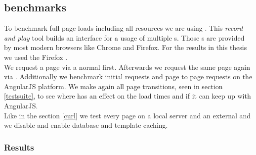 \subsection{\selenium{} benchmarks\label{selenium}}

To benchmark full page loads including all resources we are using \selenium{}.
This \emph{record and play} tool builds an interface for a usage of multiple \webdriver{}s.
Those \webdriver{}s are provided by most modern browsers like Chrome and Firefox.
For the results in this thesis we used the Firefox \webdriver{}.
\\
We request a page via a normal \httpRequest{} first.
Afterwards we request the same page again via \lare{}.
Additionally we benchmark initial requests and page to page requests on the AngularJS platform.
We make again all page transitions, seen in section \ref{testsuite}, to see where \lare{} has an effect on the load times and if it can keep up with AngularJS.
\\
Like in the section \ref{curl} we test every page on a local server and an external \webServer{} and we disable and enable database and template caching.

\subsubsection{Results}


